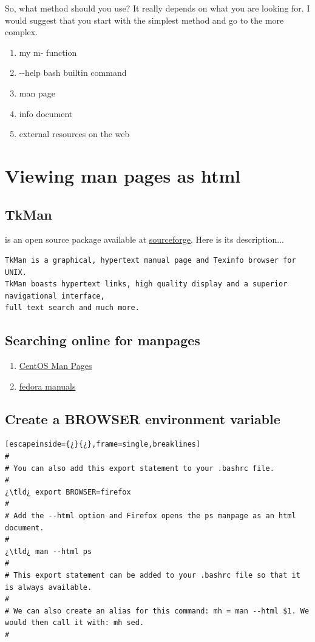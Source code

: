 So, what method should you use? It really depends on what you are looking for. I would suggest that you start with the simplest method and go to the more complex. 

\begin{enumerate}
	\item{my m- function}
	\item{-{}-{}help bash builtin command}
	\item{man page}
	\item{info document}
	\item{external resources on the web}	
\end{enumerate}

\section{Viewing man pages as html}

\subsection{TkMan}

 is an open source package available at \href{https://sourceforge.net/projects/tkman/}{sourceforge}. Here is its description...

\begin{lstlisting}
TkMan is a graphical, hypertext manual page and Texinfo browser for UNIX.
TkMan boasts hypertext links, high quality display and a superior navigational interface,
full text search and much more.
\end{lstlisting}

\subsection{Searching online for manpages}

\begin{enumerate}
	\item{\href{http://grisha.biz/cgi-bin/man}{CentOS Man Pages}}
	\item{\href{http://linuxmanpages.net/index.html}{fedora manuals}}
\end{enumerate}

\subsection{Create a BROWSER environment variable}

\begin{lstlisting}[escapeinside={¿}{¿},frame=single,breaklines]
#
# You can also add this export statement to your .bashrc file.
#
¿\tld¿ export BROWSER=firefox
#
# Add the --html option and Firefox opens the ps manpage as an html document.
#
¿\tld¿ man --html ps
#
# This export statement can be added to your .bashrc file so that it is always available.
#
# We can also create an alias for this command: mh = man --html $1. We would then call it with: mh sed.
#
\end{lstlisting}

